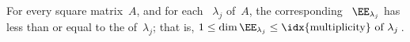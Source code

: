 \begin{theorem} \label{thm:dimee} 
For every square matrix~\(A\), and for each ~\(\lambda_j\) of~\(A\), the corresponding ~\(\EE_{\lambda_j}\) has  less than or equal to the  of~\(\lambda_j\);
that is, \(1\leq\dim\EE_{\lambda_j}\leq\text{\idx{multiplicity} of }\lambda_j\)\,.  
\end{theorem}
